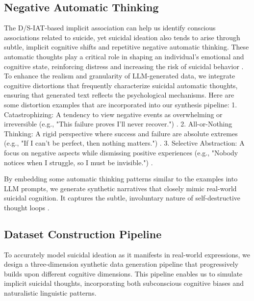 \subsection{Negative Automatic Thinking}
\label{sec:Negative Automatic Thinking}
The D/S-IAT-based implicit association can help us identify conscious associations related to suicide, yet suicidal ideation also tends to arise through subtle, implicit cognitive shifts and repetitive negative automatic thinking. These automatic thoughts play a critical role in shaping an individual’s emotional and cognitive state, reinforcing distress and increasing the risk of suicidal behavior \cite{method9}. To enhance the realism and granularity of LLM-generated data, we integrate cognitive distortions that frequently characterize suicidal automatic thoughts, ensuring that generated text reflects the psychological mechanisms. 
Here are some distortion examples that are incorporated into our synthesis pipeline: 
1. Catastrophizing: A tendency to view negative events as overwhelming or irreversible (e.g., "This failure proves I’ll never recover.") \cite{method10}. 
2. All-or-Nothing Thinking: A rigid perspective where success and failure are absolute extremes (e.g., "If I can’t be perfect, then nothing matters.") \cite{method11}.
3. Selective Abstraction: A focus on negative aspects while dismissing positive experiences (e.g., "Nobody notices when I struggle, so I must be invisible.") \cite{method12}.

By embedding some automatic thinking patterns similar to the examples into LLM prompts, we generate synthetic narratives that closely mimic real-world suicidal cognition. It captures the subtle, involuntary nature of self-destructive thought loops \cite{method13}. 
\fi
\iffalse
\subsection{Dataset Construction Pipeline}
\label{sec: Dataset Construction Pipeline}
To accurately model suicidal ideation as it manifests in real-world expressions, we design a three-dimension synthetic data generation pipeline that progressively builds upon different cognitive dimensions. This pipeline enables us to simulate implicit suicidal thoughts, incorporating both subconscious cognitive biases and naturalistic linguistic patterns.

